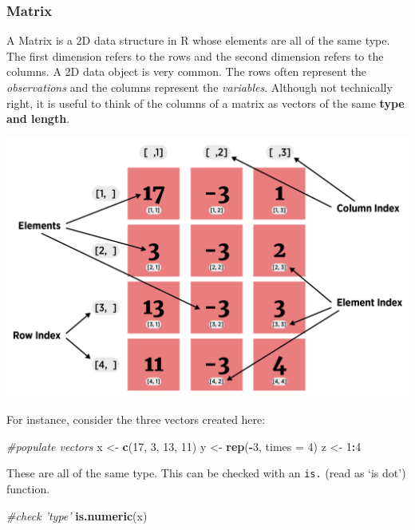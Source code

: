 \documentclass[
]{book}
\newenvironment{Shaded}{\begin{snugshade}}{\end{snugshade}}
\newcommand{\CommentTok}[1]{\textcolor[rgb]{0.56,0.35,0.01}{\textit{#1}}}
\newcommand{\DataTypeTok}[1]{\textcolor[rgb]{0.13,0.29,0.53}{#1}}
\newcommand{\DecValTok}[1]{\textcolor[rgb]{0.00,0.00,0.81}{#1}}
\newcommand{\KeywordTok}[1]{\textcolor[rgb]{0.13,0.29,0.53}{\textbf{#1}}}
\newcommand{\NormalTok}[1]{#1}
\newcommand{\OperatorTok}[1]{\textcolor[rgb]{0.81,0.36,0.00}{\textbf{#1}}}
\newcommand{\StringTok}[1]{\textcolor[rgb]{0.31,0.60,0.02}{#1}}
\theoremstyle{definition}
\theoremstyle{definition}
\theoremstyle{definition}
\theoremstyle{remark}
\begin{document}
\hypertarget{matrix}{%
\subsubsection{Matrix}\label{matrix}}

A Matrix is a 2D data structure in R whose elements are all of the same type. The first dimension refers to the rows and the second dimension refers to the columns. A 2D data object is very common. The rows often represent the \emph{observations} and the columns represent the \emph{variables}. Although not technically right, it is useful to think of the columns of a matrix as vectors of the same \textbf{type and length}.

\begin{center}\includegraphics[width=0.75\linewidth]{img/matrixVisualF} \end{center}

For instance, consider the three vectors created here:

\begin{Shaded}
\begin{Highlighting}[]
\CommentTok{#populate vectors}
\NormalTok{x <-}\StringTok{ }\KeywordTok{c}\NormalTok{(}\DecValTok{17}\NormalTok{, }\DecValTok{3}\NormalTok{, }\DecValTok{13}\NormalTok{, }\DecValTok{11}\NormalTok{)}
\NormalTok{y <-}\StringTok{ }\KeywordTok{rep}\NormalTok{(}\OperatorTok{-}\DecValTok{3}\NormalTok{, }\DataTypeTok{times =} \DecValTok{4}\NormalTok{)}
\NormalTok{z <-}\StringTok{ }\DecValTok{1}\OperatorTok{:}\DecValTok{4}
\end{Highlighting}
\end{Shaded}

These are all of the same type. This can be checked with an \texttt{is.} (read as `is dot') function.

\begin{Shaded}
\begin{Highlighting}[]
\CommentTok{#check 'type'}
\KeywordTok{is.numeric}\NormalTok{(x)}
\end{Highlighting}
\end{Shaded}
\end{document}
